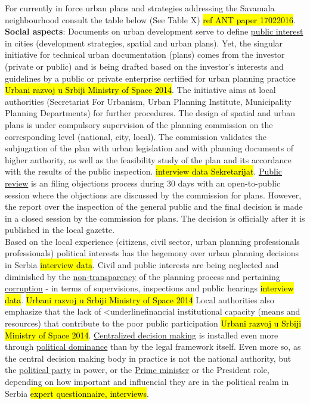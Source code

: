 \documentclass[11pt]{report}
\begin{document}
\begin{itemize}
For currently in force urban plans and strategies addressing the Savamala neighbourhood consult the table below (See Table X) \hl{ref ANT paper 17022016}. 
\\
\textbf{Social aspects}:
Documents on urban development serve to define  \underline{public interest} in cities (development strategies, spatial and urban plans).
Yet, the singular initiative for technical urban documentation (plans) comes from the investor (private or public) and is being drafted based on the investor's interests and guidelines by a public or private enterprise certified for urban planning practice \hl{Urbani razvoj u Srbiji Ministry of Space 2014}. The initiative aims at local authorities (Secretariat For Urbanism, Urban Planning Institute, Municipality Planning Departments) for further procedures.
The design of spatial and urban plans is under compulsory supervision of the planning commission on the corresponding level (national, city, local). The commission validates the subjugation of the plan with urban legislation and with planning documents of higher authority, as well as the feasibility study of the plan and its accordance with the results of the public inspection.
\hl{interview data Sekretarijat}.  
\underline{Public review} is an filing objections process during 30 days with an open-to-public session  where the objections are discussed by the commission for plans. However, the report over the inspection of the general public and the final decision is made in a closed session by the commission for plans. The decision is officially after it is published in the local gazette.
\\
Based on the local experience (citizens, civil sector, urban planning professionals professionals) political interests has the hegemony over urban planning decisions in Serbia \hl{interview data}. Civil and public interests are being neglected and diminished by the \underline{non-transparency} of the planning process and pertaining \underline{corruption} - in terms of supervisions, inspections and public hearings \hl{interview data}.
\hl{Urbani razvoj u Srbiji Ministry of Space 2014}
Local authorities also emphasize that the lack of <underline{financial institutional capacity} (means and resources) that contribute to the poor public participation \hl{Urbani razvoj u Srbiji Ministry of Space 2014}. \underline{Centralized decision making} is installed even more through \underline{political dominance} than by the legal framework itself.
Even more so, as the central decision making body in practice is not the national authority, but the  \underline{political party} in power, or the  \underline{Prime minister} or the President role, depending on how important and influencial they are in the political realm in Serbia \hl{expert questionnaire, interviews}.

\end{itemize}
\end{document}

